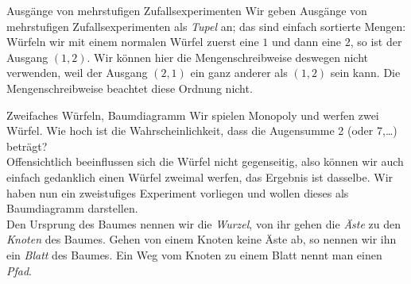 \begin{bla}{Ausgänge von mehrstufigen Zufallsexperimenten}
  Wir geben Ausgänge von mehrstufigen Zufallsexperimenten als \emph{Tupel} an; das sind einfach sortierte Mengen: Würfeln wir mit einem normalen Würfel zuerst eine $1$ und dann eine $2$, so ist der Ausgang $(1,2)$. Wir können hier die Mengenschreibweise deswegen nicht verwenden, weil der Ausgang $(2,1)$ ein ganz anderer als $(1,2)$ sein kann. Die Mengenschreibweise beachtet diese Ordnung nicht.
\end{bla}

\begin{bla}{Zweifaches Würfeln, Baumdiagramm}
  Wir spielen Monopoly und werfen zwei Würfel. Wie hoch ist die Wahrscheinlichkeit,
  dass die Augensumme 2 (oder 7,\dots) beträgt?
  \\
  Offensichtlich beeinflussen sich die Würfel nicht gegenseitig, also können wir
  auch einfach gedanklich einen Würfel zweimal werfen, das Ergebnis ist dasselbe.
  Wir haben nun ein zweistufiges Experiment vorliegen und wollen dieses als
  Baumdiagramm darstellen.
  \\
  Den Ursprung des Baumes nennen wir die \emph{Wurzel}, von ihr gehen die \emph{Äste}
  zu den \emph{Knoten} des Baumes. Gehen von einem Knoten keine Äste ab, so nennen wir ihn
  ein \emph{Blatt} des Baumes. Ein Weg vom Knoten zu einem Blatt nennt man einen \emph{Pfad}.

  \begin{marginfigure}[-10em]
    \caption{Das Baumdiagramm des zweifachen Würfelwurfs (zur Übersichtlichkeit mit nur einer zweiten Stufe und mit jeweils nur drei Zwischenausgängen).
    Markiert sind die \textcolor{green!60!black}{\textbf{Wurzel}}, ein \textcolor{red!70!black}{\textbf{Blatt}},
    sowie der \textcolor{orange}{\textbf{Pfad}} von der Wurzel zu diesem Blatt.}
  \end{marginfigure}
\end{bla}

